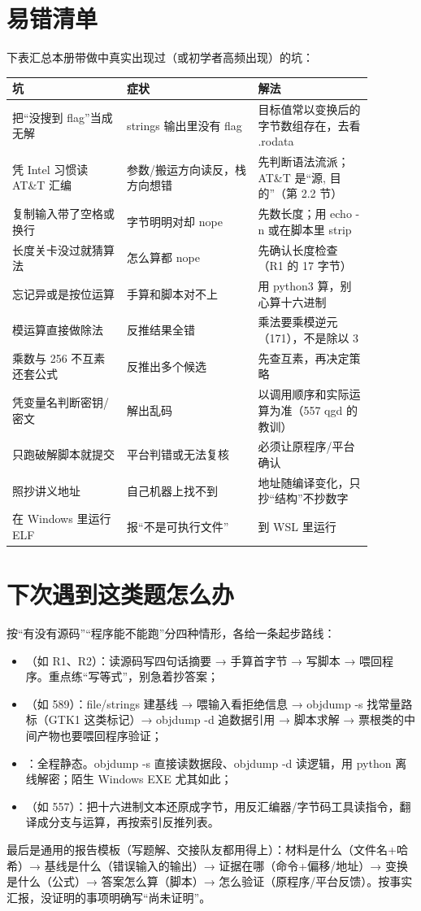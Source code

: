 \documentclass[UTF8,12pt,oneside]{ctexbook}
\begin{document}
\section{易错清单}
下表汇总本册带做中真实出现过（或初学者高频出现）的坑：
\begin{center}
\begin{tabular}{p{0.28\linewidth}p{0.32\linewidth}p{0.28\linewidth}}
\toprule
坑 & 症状 & 解法 \\
\midrule
把“没搜到 flag”当成无解 & strings 输出里没有 flag & 目标值常以变换后的字节数组存在，去看 .rodata \\
凭 Intel 习惯读 AT\&T 汇编 & 参数/搬运方向读反，栈方向想错 & 先判断语法流派；AT\&T 是“源, 目的”（第 2.2 节） \\
复制输入带了空格或换行 & 字节明明对却 nope & 先数长度；用 echo -n 或在脚本里 strip \\
长度关卡没过就猜算法 & 怎么算都 nope & 先确认长度检查（R1 的 17 字节） \\
忘记异或是按位运算 & 手算和脚本对不上 & 用 python3 算，别心算十六进制 \\
模运算直接做除法 & 反推结果全错 & 乘法要乘模逆元（171），不是除以 3 \\
乘数与 256 不互素还套公式 & 反推出多个候选 & 先查互素，再决定策略 \\
凭变量名判断密钥/密文 & 解出乱码 & 以调用顺序和实际运算为准（557 qgd 的教训） \\
只跑破解脚本就提交 & 平台判错或无法复核 & 必须让原程序/平台确认 \\
照抄讲义地址 & 自己机器上找不到 & 地址随编译变化，只抄“结构”不抄数字 \\
在 Windows 里运行 ELF & 报“不是可执行文件” & 到 WSL 里运行 \\
\bottomrule
\end{tabular}
\end{center}

\section{下次遇到这类题怎么办}
按“有没有源码”“程序能不能跑”分四种情形，各给一条起步路线：
\begin{itemize}
\item {}（如 R1、R2）：读源码写四句话摘要 → 手算首字节 → 写脚本 → 喂回程序。重点练“写等式”，别急着抄答案；
\item {}（如 589）：file/strings 建基线 → 喂输入看拒绝信息 → objdump -s 找常量路标（GTK1 这类标记）→ objdump -d 追数据引用 → 脚本求解 → 票根类的中间产物也要喂回程序验证；
\item {}：全程静态。objdump -s 直接读数据段、objdump -d 读逻辑，用 python 离线解密；陌生 Windows EXE 尤其如此；
\item {}（如 557）：把十六进制文本还原成字节，用反汇编器/字节码工具读指令，翻译成分支与运算，再按索引反推列表。
\end{itemize}
最后是通用的报告模板（写题解、交接队友都用得上）：材料是什么（文件名+哈希）→ 基线是什么（错误输入的输出）→ 证据在哪（命令+偏移/地址）→ 变换是什么（公式）→ 答案怎么算（脚本）→ 怎么验证（原程序/平台反馈）。按事实汇报，没证明的事项明确写“尚未证明”。
\end{document}
